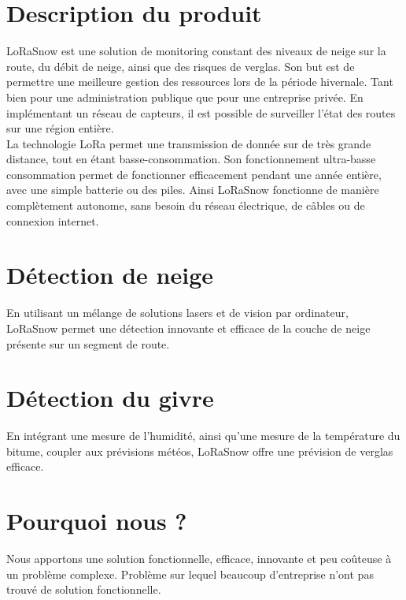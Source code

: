 \section{Description du produit}
LoRaSnow est une solution de monitoring constant des niveaux de neige
sur la route, du débit de neige, ainsi que des risques de verglas.
Son but est de permettre une meilleure gestion des ressources
lors de la période hivernale. Tant bien pour une administration publique
que pour une entreprise privée. En implémentant un réseau de capteurs,
il est possible de surveiller l'état des routes sur une région entière.\\
La technologie LoRa permet une transmission de donnée sur de très grande distance,
tout en étant basse-consommation.
Son fonctionnement ultra-basse consommation permet de fonctionner efficacement
pendant une année entière, avec une simple batterie ou des piles.
Ainsi LoRaSnow fonctionne de manière complètement autonome, sans besoin du réseau
électrique, de câbles ou de connexion internet.

\section{Détection de neige}
En utilisant un mélange de solutions lasers et de vision par ordinateur,
LoRaSnow permet une détection innovante et efficace de la couche de neige
présente sur un segment de route.

\section{Détection du givre}
En intégrant une mesure de l'humidité, ainsi qu'une mesure de la température
du bitume, coupler aux prévisions météos, LoRaSnow offre une prévision
de verglas efficace.

\section{Pourquoi nous ?}
Nous apportons une solution fonctionnelle, efficace, innovante et peu
coûteuse à un problème complexe. Problème sur lequel beaucoup d'entreprise
n'ont pas trouvé de solution fonctionnelle.